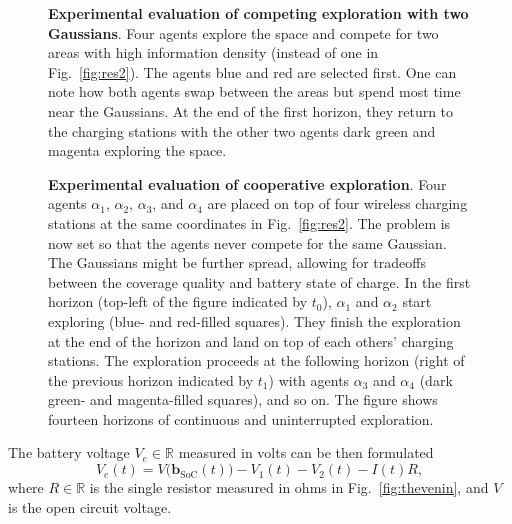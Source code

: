 \documentclass[letterpaper,10pt,conference,twoside]{IEEEtran}
\theoremstyle{definition}
\begin{document}
\begin{figure}[b!]
  \vspace*{-.3cm}
  \hspace*{-.2cm}
  
  \caption{\textbf{Experimental evaluation of %
  competing exploration with two Gaussians}. Four agents explore the space and compete for two areas with high information density (instead of one in Fig.~\ref{fig:res2}). The agents blue and red are selected first. One can note how both agents swap between the areas but spend most time near the Gaussians. At the end of the first horizon, they return to the charging stations with the other two agents dark green and magenta exploring the space.}
  \label{fig:res3}
\end{figure}

\begin{figure*}[t!]
  \vspace*{.17cm}
  \begin{minipage}[t]{1\columnwidth}
    
  \end{minipage}
  \hspace{.42cm}
  \begin{minipage}[t]{.97\columnwidth}
    \vspace*{-4.2cm}
    \caption{\textbf{Experimental evaluation of cooperative exploration}. Four agents $\alpha_1$, $\alpha_2$, $\alpha_3$, and $\alpha_4$ are placed on top of four wireless charging stations at the same coordinates in Fig.~\ref{fig:res2}. The problem is now set so %
    that the agents never compete for the same Gaussian. The Gaussians might be further spread, allowing for tradeoffs between the coverage quality and battery state of charge. In the first horizon (top-left of the figure indicated by $t_0$), $\alpha_1$ and $\alpha_2$ start exploring (blue- and red-filled squares). They finish the exploration at the end of the horizon and land on top of each others' charging stations. The exploration proceeds at the following horizon (right of the previous horizon indicated by $t_1$) with agents $\alpha_3$ and $\alpha_4$ (dark green- and magenta-filled squares), and so on. The figure shows fourteen horizons of continuous and uninterrupted exploration.}
    \label{fig:res}
  \end{minipage}
  \vspace*{-.6cm}
\end{figure*}

The battery voltage $V_e\in\mathbb{R}$ measured in volts can be then formulated %
\begin{equation}\label{eq:battvolt}
  V_e(t)=V\big(\mathbf{b}_{\text{SoC}}(t)\big)-V_1(t)-V_2(t)-I(t)R,
\end{equation}
where $R\in\mathbb{R}$ is the single resistor measured in ohms in Fig.~\ref{fig:thevenin}, and $V$ is the open circuit voltage. %
\end{document}
